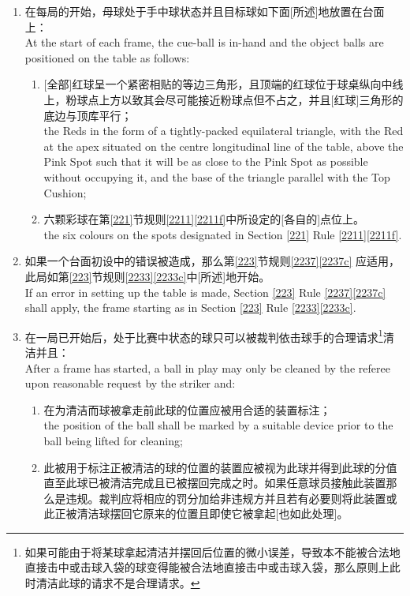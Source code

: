 \begin{enumerate}[label=(\alph*)]
    \item 在每局的开始，母球处于手中球状态并且目标球如下面[所述]地放置在台面上：\\
    At the start of each frame, the cue-ball is in-hand and the object balls are positioned on the table as follows:
    \begin{enumerate}[label=(\roman*)]
        \item ${}$[全部]红球呈一个紧密相贴的等边三角形，且顶端的红球位于球桌纵向中线上，粉球点上方以致其会尽可能接近粉球点但不占之，并且[红球]三角形的底边与顶库平行；\\
        the Reds in the form of a tightly-packed equilateral triangle, with the Red at the apex situated on the centre longitudinal line of the table, above the Pink Spot such that it will be as close to the Pink Spot as possible without occupying it, and the base of the triangle parallel with the Top Cushion;
        \item 六颗彩球在第\ref{221}节规则\ref{2211}\ref{2211f}中所设定的[各自的]点位上。\\
        the six colours on the spots designated in Section \ref{221} Rule \ref{2211}\ref{2211f}.
    \end{enumerate}
    \item 如果一个台面初设中的错误被造成，那么第\ref{223}节规则\ref{2237}\ref{2237c} 应适用，此局如第\ref{223}节规则\ref{2233}\ref{2233c}中[所述]地开始。\\
    If an error in setting up the table is made, Section \ref{223} Rule \ref{2237}\ref{2237c} shall apply, the frame starting as in Section \ref{223} Rule \ref{2233}\ref{2233c}.
    \item \label{2232c}在一局已开始后，处于比赛中状态的球只可以被裁判依击球手的合理请求\footnote{如果可能由于将某球拿起清洁并摆回后位置的微小误差，导致本不能被合法地直接击中或击球入袋的球变得能被合法地直接击中或击球入袋，那么原则上此时清洁此球的请求不是合理请求。}清洁并且：\\
    After a frame has started, a ball in play may only be cleaned by the referee upon reasonable request by the striker and:
    \begin{enumerate}[label=(\roman*)]
        \item 在为清洁而球被拿走前此球的位置应被用合适的装置标注；\\
        the position of the ball shall be marked by a suitable device prior to the ball being lifted for cleaning;
        \item \label{2232cii}此被用于标注正被清洁的球的位置的装置应被视为此球并得到此球的分值直至此球已被清洁完成且已被摆回完成之时。如果任意球员接触此装置那么是违规。裁判应将相应的罚分加给非违规方并且若有必要则将此装置或此正被清洁球摆回它原来的位置且即使它被拿起[也如此处理]。\\

\end{enumerate}
\end{enumerate}
